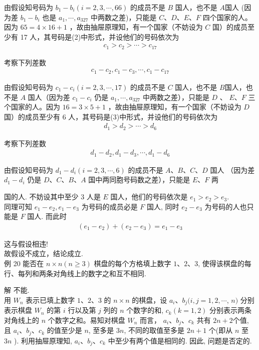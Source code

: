\documentclass[10pt]{article}
\begin{document}
由假设知号码为 $b_{1}-b_{i}(i=2,3, \cdots, 66)$ 的成员不是 $B$ 国人，也不是 $A$国人 (因为差 $b_{1}-b_{i}$ 也是 $a_{1}, \cdots, a_{327}$ 中两数之差)，只能是 $C 、 D 、 E 、 F$ 四个国家的人。因为 $65=4 \times 16+1$ ，故由抽屉原理知，有一个国家（不妨设为 $C$ 国）的成员至少有 17 人，其号码是(2)中形式，并设他们的号码依次为\\
\begin{align*}
c_{1}>c_{2}>\cdots>c_{17}
\end{align*}

考察下列差数\\
\begin{align*}
c_{1}-c_{2}, c_{1}-c_{3}, \cdots, c_{1}-c_{17}
\end{align*}

由假设知号码为 $c_{1}-c_{i}(i=2,3, \cdots, 17)$ 的成员不是 $C$ 国人，也不是 $B$国人，也不是 $A$ 国人（因为差 $c_{1}-c_{i}$ 仍是 $a_{1}, \cdots, a_{327}$ 中两数之差），只能是 $D$ 、 $E 、 F$ 三个国家的人。因为 $16=3 \times 5+1$ ，故由抽屉原理知，有一个国家（不妨设为 $D$ 国）的成员至少有 6 人，其号码是(3)中形式，并设他们的号码依次为\\
\begin{align*}
d_{1}>d_{2}>\cdots>d_{6}
\end{align*}

考察下列差数\\
\begin{align*}
d_{1}-d_{2}, d_{1}-d_{3}, \cdots, d_{1}-d_{6}
\end{align*}

由假设知号码为 $d_{1}-d_{i}(i=2,3, \cdots, 6)$ 的成员不是 $A 、 B 、 C 、 D$ 国人 （因为差 $d_{1}-d_{i}$ 仍是 $D 、 C 、 B 、 A$ 国中两同胞号码数之差），只能是 $E 、 F$ 两

国的人. 不妨设其中至少 3 人是 $E$ 国人，他们的号码依次是 $e_{1}>e_{2}>e_{3}$.\\
同理可知 $e_{1}-e_{2}, e_{1}-e_{3}$ 为号码的成员必是 $F$ 国人, 同时 $e_{2}-e_{3}$ 为号码的人也只能是 $F$ 国人. 而此时\\
\begin{align*}
\left(e_{1}-e_{2}\right)+\left(e_{2}-e_{3}\right)=e_{1}-e_{3}
\end{align*}

这与假设相违!\\
故假设不成立，结论成立.\\
例 20 能否在 $n \times n(n \geqslant 3)$ 棋盘的每个方格填上数字 $1 、 2 、 3$, 使得该棋盘的每行、每列和两条对角线上的数字之和互不相同.

解 不能.\\
用 $W_{n}$ 表示已填上数字 $1 、 2 、 3$ 的 $n \times n$ 的棋盘，设 $a_{i} 、 b_{j}(i, j=1,2, \cdots$, $n)$ 分别表示棋盘 $W_{n}$ 的第 $i$ 行以及第 $j$ 列的 $n$ 个数字的和, $c_{k}(k=1,2)$ 分别表示两条对角线上的 $n$ 个数字之和。易知对棋盘 $W_{n}$ 而言， $a_{i} 、 b_{j} 、 c_{k}$ 共有 $2 n+2$个值, 且 $a_{i} 、 b_{j} 、 c_{k}$ 的值至少是 $n$, 至多是 $3 n$, 不同的取值至多是 $2 n+1$ 个(即从 $n$ 至 $3 n$ ). 利用抽屉原理知, $a_{i} 、 b_{j} 、 c_{k}$ 中至少有两个值是相同的. 因此, 问题是否定的.
\end{document}
